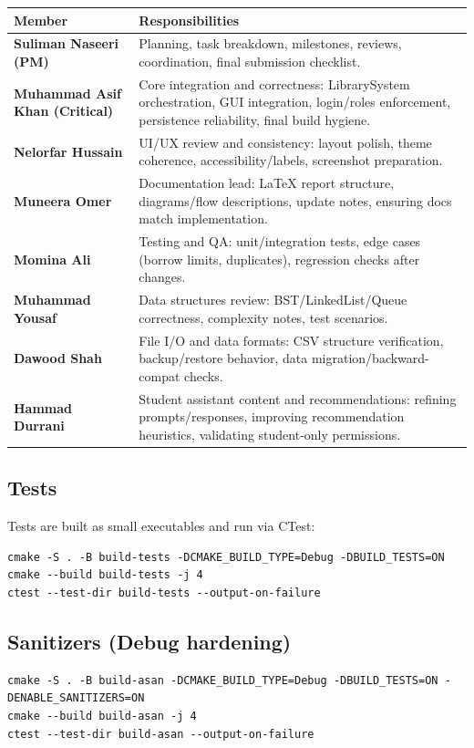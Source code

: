 \documentclass[11pt,a4paper]{article}
\begin{document}
\begin{tabularx}{\textwidth}{>{\bfseries}l X}
\toprule
Member & Responsibilities \\
\midrule
Suliman Naseeri (PM) & Planning, task breakdown, milestones, reviews, coordination, final submission checklist. \\
Muhammad Asif Khan (Critical) & Core integration and correctness: LibrarySystem orchestration, GUI integration, login/roles enforcement, persistence reliability, final build hygiene. \\
Nelorfar Hussain & UI/UX review and consistency: layout polish, theme coherence, accessibility/labels, screenshot preparation. \\
Muneera Omer & Documentation lead: LaTeX report structure, diagrams/flow descriptions, update notes, ensuring docs match implementation. \\
Momina Ali & Testing and QA: unit/integration tests, edge cases (borrow limits, duplicates), regression checks after changes. \\
Muhammad Yousaf & Data structures review: BST/LinkedList/Queue correctness, complexity notes, test scenarios. \\
Dawood Shah & File I/O and data formats: CSV structure verification, backup/restore behavior, data migration/backward-compat checks. \\
Hammad Durrani & Student assistant content and recommendations: refining prompts/responses, improving recommendation heuristics, validating student-only permissions. \\
\bottomrule
\end{tabularx}

\subsection{Tests}
Tests are built as small executables and run via CTest:
\begin{lstlisting}
cmake -S . -B build-tests -DCMAKE_BUILD_TYPE=Debug -DBUILD_TESTS=ON
cmake --build build-tests -j 4
ctest --test-dir build-tests --output-on-failure
\end{lstlisting}

\subsection{Sanitizers (Debug hardening)}
\begin{lstlisting}
cmake -S . -B build-asan -DCMAKE_BUILD_TYPE=Debug -DBUILD_TESTS=ON -DENABLE_SANITIZERS=ON
cmake --build build-asan -j 4
ctest --test-dir build-asan --output-on-failure
\end{lstlisting}
\end{document}
